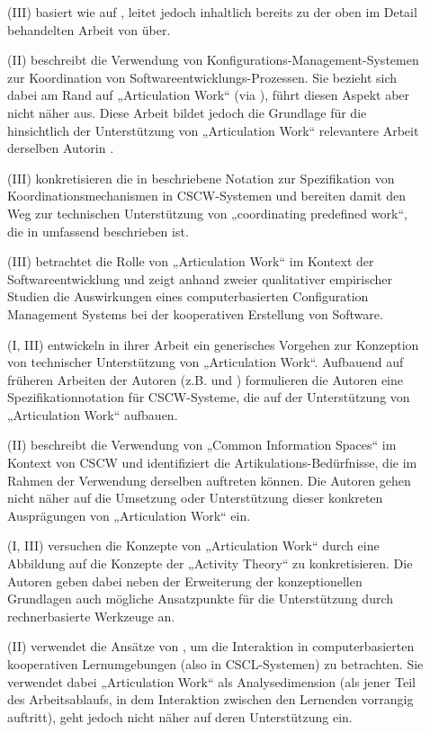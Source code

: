 \begin{description}
	\item[\citet{Schmidt95}] (III) basiert wie \citep{Schmidt94} auf \citep{Schmidt90}, leitet jedoch inhaltlich bereits zu der oben im Detail behandelten Arbeit von \citet{Schmidt96} über.
	\item[\citet{Grinter95}] (II) beschreibt die Verwendung von Konfigurations-Management-Systemen zur Koordination von Softwareentwicklungs-Prozessen. Sie bezieht sich dabei am Rand auf „Articulation Work“ (via \citep{Schmidt92}), führt diesen Aspekt aber nicht näher aus. Diese Arbeit bildet jedoch die Grundlage für die hinsichtlich der Unterstützung von „Articulation Work“ relevantere Arbeit derselben Autorin \citep{Grinter96}.
	\item[\citet{Simone95}] (III) konkretisieren die in \citet{Schmidt96} beschriebene Notation zur Spezifikation von Koordinationsmechanismen in \gls{CSCW}-Systemen und bereiten damit den Weg zur technischen Unterstützung von „coordinating predefined work“, die in \citep{Divitini00} umfassend beschrieben ist.
	\item[\citet{Grinter96}] (III) betrachtet die Rolle von „Articulation Work“ im Kontext der Softwareentwicklung und zeigt anhand zweier qualitativer empirischer Studien die Auswirkungen eines computerbasierten Configuration Management Systems bei der kooperativen Erstellung von Software.
	\item[\citet{Schmidt96}] (I, III) entwickeln in ihrer Arbeit ein generisches Vorgehen zur Konzeption von technischer Unterstützung von „Articulation Work“. Aufbauend auf früheren Arbeiten der Autoren (z.B. \citep{Schmidt90} und \citep{Schmidt92}) formulieren die Autoren eine Spezifikationnotation für \gls{CSCW}-Systeme, die auf der Unterstützung von „Articulation Work“ aufbauen.
	\item[\citet{Bannon97}] (II) beschreibt die Verwendung von „Common Information Spaces“ im Kontext von \gls{CSCW} und identifiziert die Artikulations-Bedürfnisse, die im Rahmen der Verwendung derselben auftreten können. Die Autoren gehen nicht näher auf die Umsetzung oder Unterstützung dieser konkreten Ausprägungen von „Articulation Work“ ein.
	\item[\citet{Fjuk97}] (I, III) versuchen die Konzepte von „Articulation Work“ durch eine Abbildung auf die Konzepte der „Activity Theory“ zu konkretisieren. Die Autoren geben dabei neben der Erweiterung der konzeptionellen Grundlagen auch mögliche Ansatzpunkte für die Unterstützung durch rechnerbasierte Werkzeuge an.
	\item[\citet{Fjuk97a}] (II) verwendet die Ansätze von \citet{Strauss93}, um die Interaktion in computerbasierten kooperativen Lernumgebungen (also in \gls{CSCL}-Systemen) zu betrachten. Sie verwendet dabei „Articulation Work“ als Analysedimension (als jener Teil des Arbeitsablaufs, in dem Interaktion zwischen den Lernenden vorrangig auftritt), geht jedoch nicht näher auf deren Unterstützung ein.

\end{description}
